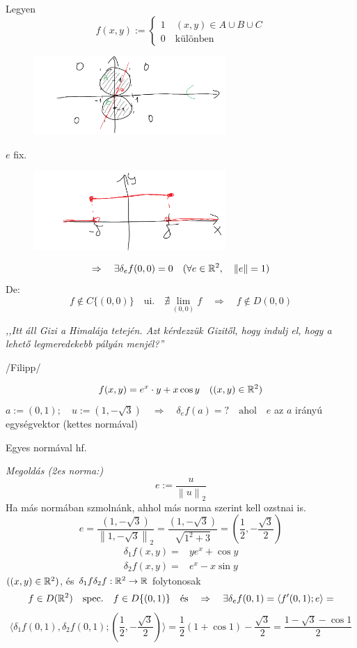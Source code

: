 \documentclass[a4paper,11.5pt]{article}
\newcommand{\norm}[1]{\left\lVert#1\right\rVert}
\begin{document}
	\begin{note}
		Legyen
		\[ f(x,y):=\begin{cases}
			1\quad (x,y)\in A\cup B\cup C\\
			0\quad \text{különben}
		\end{cases} \]
		\begin{figure}[H]
			\centering
			\includegraphics[height=3cm]{kepek/05.png}
			\caption{}
		\end{figure}
		$e$ fix.
		\begin{figure}[H]
			\centering
			\includegraphics[height=3cm]{kepek/06.png}
			\caption{}
		\end{figure}
		\[ \Rightarrow\quad \exists\delta_ef(0,0)=0\quad (\forall e\in\R^2,\quad \norm{e}=1) \]
		De:
		\[ f\notin C\{(0,0)\} \quad \text{ui.}\quad \nexists\lim_{(0,0)}f\quad \Rightarrow\quad f\notin D(0,0) \]
	\end{note}
	\begin{center}
		\textit{,,Itt áll Gizi a Himalája tetején. Azt kérdezzük Gizitől, hogy indulj el, hogy a lehető legmeredekebb pályán menjél?''}
		
		/Filipp/
	\end{center}
	\begin{task}
		\[ f(x,y)=e^x\cdot y+x\cos y\quad ((x,y)\in\mathbb{R}^2) \]
		$a:=(0,1);\quad u:=(1,-\sqrt{3})\quad \Rightarrow\quad \delta_ef(a)=?\quad \text{ahol}\quad e$ az $a$ irányú egységvektor (kettes normával)
		
		Egyes normával hf.
		
		\textit{Megoldás (2es norma:)} 
		\[ e:=\frac{u}{\norm{u}_2} \]
		Ha más normában szmolnánk, ahhol más norma szerint kell ozstnai is.
		\[ e=\frac{(1,-\sqrt{3})}{\norm{1,-\sqrt{3}}_2}=\frac{(1,-\sqrt{3})}{ \sqrt{1^2+3}}=\left(\frac{1}{2},-\frac{\sqrt{3}}{2}\right) \]
		\begin{align*}
			\delta_1f(x,y)=&ye^x+\cos y\\
			\delta_2f(x,y)=&e^x-x\sin y
		\end{align*}
		$((x,y)\in\mathbb{R}^2)$, és $\delta_1f\delta_2f:\mathbb{R}^2\to\mathbb{R}$ folytonosak
		\[ f\in D(\mathbb{R}^2)\quad \text{spec.}\quad f\in D\{(0,1)\}\quad \text{és}\quad \Rightarrow\quad \exists\delta_ef(0,1)=\langle f'(0,1);e\rangle=\]\[\langle \delta_1f(0,1),\delta_2f(0,1);\left(\frac{1}{2},-\frac{\sqrt{3}}{2}\right)\rangle=\frac{1}{2}(1+\cos 1)-\frac{\sqrt{3}}{2}=\frac{1-\sqrt{3}-\cos1}{2} \]
	\end{task}
\end{document}

